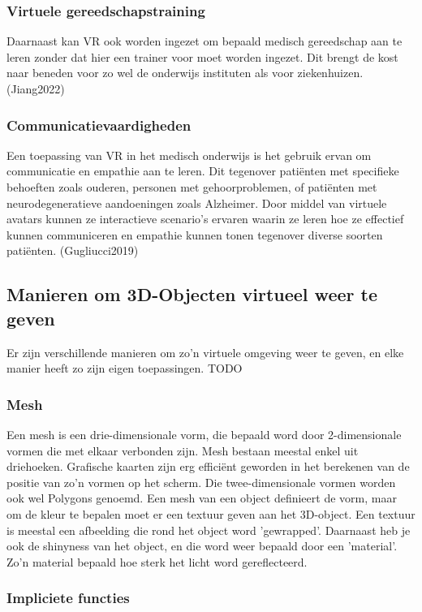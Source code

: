 \subsubsection{Virtuele gereedschapstraining}
Daarnaast kan VR ook worden ingezet om bepaald medisch gereedschap aan te leren zonder dat hier een trainer voor moet worden ingezet. Dit brengt de kost naar beneden voor zo wel de onderwijs instituten als voor ziekenhuizen. (Jiang2022)

\subsubsection{Communicatievaardigheden}
Een toepassing van VR in het medisch onderwijs is het gebruik ervan om communicatie en empathie aan te leren. Dit tegenover patiënten met specifieke behoeften zoals ouderen, personen met gehoorproblemen, of patiënten met neurodegeneratieve aandoeningen zoals Alzheimer. Door middel van virtuele avatars kunnen ze interactieve scenario's ervaren waarin ze leren hoe ze effectief kunnen communiceren en empathie kunnen tonen tegenover diverse soorten patiënten. (Gugliucci2019)

\subsection{Manieren om 3D-Objecten virtueel weer te geven}

Er zijn verschillende manieren om zo’n virtuele omgeving weer te geven, en elke manier heeft zo zijn eigen toepassingen.  TODO

\subsubsection{Mesh}

Een mesh is een drie-dimensionale vorm, die bepaald word door 2-dimensionale vormen die met elkaar verbonden zijn. Mesh bestaan meestal enkel uit driehoeken. Grafische kaarten zijn erg efficiënt geworden in het berekenen van de positie van zo'n vormen op het scherm. Die twee-dimensionale vormen worden ook wel Polygons genoemd.  \autocite{Luebke2002}
Een mesh van een object definieert de vorm, maar om de kleur te bepalen moet er een textuur geven aan het 3D-object. Een textuur is meestal een afbeelding die rond het object word 'gewrapped'.
Daarnaast heb je ook de shinyness van het object, en die word weer bepaald door een 'material'. Zo'n material bepaald hoe sterk het licht word gereflecteerd.

\subsubsection{Impliciete functies}

